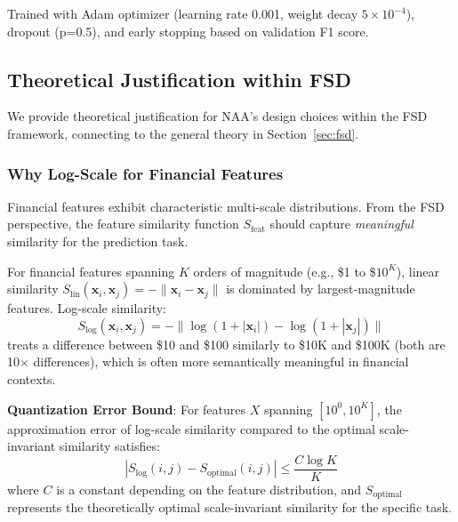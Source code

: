 Trained with Adam optimizer (learning rate 0.001, weight decay $5 \times 10^{-4}$), dropout (p=0.5), and early stopping based on validation F1 score.

\subsection{Theoretical Justification within FSD}
\label{sec:theory}

We provide theoretical justification for NAA's design choices within the FSD framework, connecting to the general theory in Section~\ref{sec:fsd}.

\subsubsection{Why Log-Scale for Financial Features}

Financial features exhibit characteristic multi-scale distributions. From the FSD perspective, the feature similarity function $S_{\text{feat}}$ should capture \textit{meaningful} similarity for the prediction task.

\begin{theorem}
\label{thm:log_similarity}
For financial features spanning $K$ orders of magnitude (e.g., \$1 to \$$10^K$), linear similarity $S_{\text{lin}}(\mathbf{x}_i, \mathbf{x}_j) = -\|\mathbf{x}_i - \mathbf{x}_j\|$ is dominated by largest-magnitude features. Log-scale similarity:
\begin{equation}
S_{\text{log}}(\mathbf{x}_i, \mathbf{x}_j) = -\|\log(1+|\mathbf{x}_i|) - \log(1+|\mathbf{x}_j|)\|
\end{equation}
treats a difference between \$10 and \$100 similarly to \$10K and \$100K (both are 10$\times$ differences), which is often more semantically meaningful in financial contexts.

\textbf{Quantization Error Bound}: For features $X$ spanning $[10^0, 10^K]$, the approximation error of log-scale similarity compared to the optimal scale-invariant similarity satisfies:
\begin{equation}
\left| S_{\text{log}}(i,j) - S_{\text{optimal}}(i,j) \right| \leq \frac{C \log K}{K}
\end{equation}
where $C$ is a constant depending on the feature distribution, and $S_{\text{optimal}}$ represents the theoretically optimal scale-invariant similarity for the specific task.
\end{theorem}

